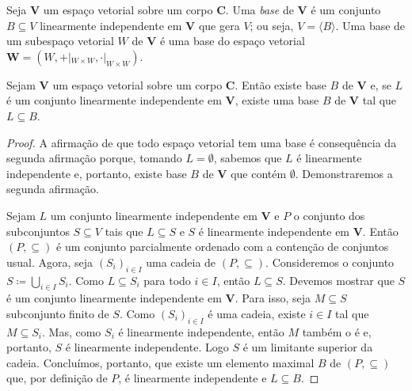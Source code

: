 \begin{defi}
	Seja $\bm V$ um espaço vetorial sobre um corpo $\bm C$. Uma \emph{base} de $\bm V$ é um conjunto $B \subseteq V$ linearmente independente em $\bm V$ que gera $V$; ou seja, $V=\langle B \rangle$. Uma base de um subespaço vetorial $W$ de $\bm V$ é uma base do espaço vetorial $\bm W=(W,+|_{W \times W},\cdot|_{W \times W})$.
\end{defi}

\begin{teo}
	Sejam $\bm V$ um espaço vetorial sobre um corpo $\bm C$. Então existe base $B$ de $\bm V$ e, se $L$  é um conjunto linearmente independente em $\bm V$, existe uma base $B$ de $\bm V$ tal que $L \subseteq B$.
\end{teo}
\begin{proof}
	A afirmação de que todo espaço vetorial tem uma base é consequência da segunda afirmação porque, tomando $L=\emptyset$, sabemos que $L$ é linearmente independente e, portanto, existe base $B$ de $\bm V$ que contém $\emptyset$. Demonstraremos a segunda afirmação.

	Sejam $L$ um conjunto linearmente independente em $\bm V$ e $P$ o conjunto dos subconjuntos $S \subseteq V$ tais que $L \subseteq S$ e $S$ é linearmente independente em $\bm V$. Então $(P,\subseteq)$ é um conjunto parcialmente ordenado com a contenção de conjuntos usual. Agora, seja $(S_i)_{i \in I}$ uma cadeia de $(P,\subseteq)$. Consideremos o conjunto $S \coloneqq \bigcup_{i \in I} S_i$. Como $L \subseteq S_i$ para todo $i \in I$, então $L \subseteq S$. Devemos mostrar que $S$ é um conjunto linearmente independente em $\bm V$. Para isso, seja $M \subseteq S$ subconjunto finito de $S$. Como $(S_i)_{i \in I}$ é uma cadeia, existe $i \in I$ tal que $M \subseteq S_i$. Mas, como $S_i$ é linearmente independente, então $M$ também o é e, portanto, $S$ é linearmente independente. Logo $S$ é um limitante superior da cadeia. Concluímos, portanto, que existe um elemento maximal $B$ de $(P,\subseteq)$ que, por definição de $P$, é linearmente independente e $L \subseteq B$.


\end{proof}
